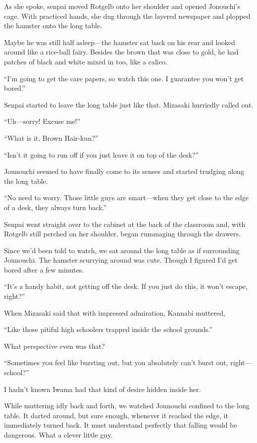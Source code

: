 \documentclass[
    a4paper,
    12pt,
    twoside,
    openany,
    UTF8,
    fontset=windows
]{ctexbook}
\begin{document}
As she spoke, senpai moved Rotgelb onto her shoulder and opened Jonouchi's cage. With practiced hands, she dug through the layered newspaper and plopped the hamster onto the long table.

Maybe he was still half asleep---the hamster sat back on his rear and looked around like a rice-ball fairy. Besides the brown that was close to gold, he had patches of black and white mixed in too, like a calico.

``I'm going to get the care papers, so watch this one. I guarantee you won't get bored.''

Senpai started to leave the long table just like that. Mizasaki hurriedly called out.

``Uh---sorry! Excuse me!''

``What is it, Brown Hair-kun?''

``Isn't it going to run off if you just leave it on top of the desk?''

Jounouchi seemed to have finally come to its senses and started trudging along the long table.

``No need to worry. Those little guys are smart---when they get close to the edge of a desk, they always turn back.''

Senpai went straight over to the cabinet at the back of the classroom and, with Rotgelb still perched on her shoulder, began rummaging through the drawers.

Since we'd been told to watch, we sat around the long table as if surrounding Jounouchi. The hamster scurrying around was cute. Though I figured I'd get bored after a few minutes.

``It's a handy habit, not getting off the desk. If you just do this, it won't escape, right?''

When Mizasaki said that with impressed admiration, Kannabi muttered,

``Like those pitiful high schoolers trapped inside the school grounds.''

What perspective even was that?

``Sometimes you feel like bursting out, but you absolutely can't burst out, right---school?''

I hadn't known Iwama had that kind of desire hidden inside her.

While muttering idly back and forth, we watched Jounouchi confined to the long table. It darted around, but sure enough, whenever it reached the edge, it immediately turned back. It must understand perfectly that falling would be dangerous. What a clever little guy.
\end{document}
